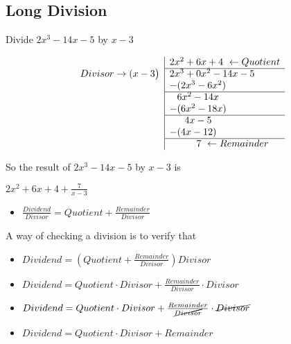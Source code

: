 \documentclass{article}
\begin{document}
\begin{onehalfspace}
    \section{Long Division}

    Divide $2x^{3} - 14x - 5$ by $x - 3$

\[
\begin{array}{r|l}
    & 2x^2 + 6x + 4 \ \leftarrow Quotient\\
    \cline{2-2}
    Divisor \rightarrow  (x - 3 \big) & 2x^3 + 0x^2 - 14x - 5 \\
    & -(2x^3 - 6x^2) \\
    \cline{2-2}
    & \phantom{-}6x^2 - 14x \\
    & -(6x^2 - 18x) \\
    \cline{2-2}
    & \phantom{--}4x - 5 \\
    & -(4x - 12) \\
    \cline{2-2}
    & \phantom{---}7 \ \leftarrow Remainder
\end{array}
\]

So the result of $2x^{3} - 14x - 5$ by $x - 3$ is \par
\begin{center}
    $2x^{2} + 6x + 4 + \frac{7}{x - 3}$
\end{center}

\begin{itemize}
    \item $\frac{Dividend}{Divisor} = Quotient + \frac{Remainder}{Divisor}$
\end{itemize}

A way of checking a division is to verify that \par

\begin{itemize}
    \item $Dividend = \left( Quotient + \frac{Remainder}{Divisor} \right) Divisor$ \par
    \item $Dividend = Quotient \cdot Divisor + \frac{Remainder}{Divisor} \cdot Divisor$ \par
    \item $Dividend = Quotient \cdot Divisor + \frac{Remainder}{\cancel{Divisor}} \cdot \cancel{Divisor}$ \par
    \item $Dividend = Quotient \cdot Divisor + Remainder$\par
\end{itemize}


\end{onehalfspace}
\end{document}
